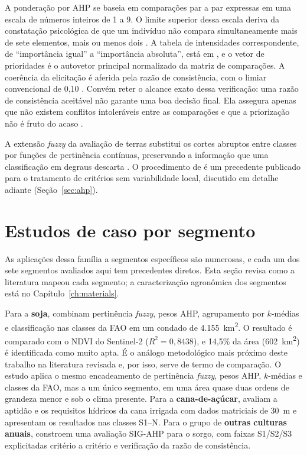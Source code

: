 A ponderação por AHP se baseia em comparações par a par expressas em uma escala de números inteiros de
1 a 9. O limite superior dessa escala deriva da constatação psicológica de que um indivíduo não compara
simultaneamente mais de sete elementos, mais ou menos dois \citep[pp.~245--246]{saaty_scaling_1977}.
A tabela de intensidades correspondente, de ``importância igual'' a ``importância absoluta'', está em
\citet[Tabela~1, p.~246]{saaty_scaling_1977}, e o vetor de prioridades é o autovetor principal
normalizado da matriz de comparações. A coerência da elicitação é aferida pela razão de consistência,
com o limiar convencional de 0,10 \citep[p.~171]{saaty_analytic_1987}. Convém reter o alcance exato
dessa verificação: uma razão de consistência aceitável não garante uma boa decisão final. Ela
assegura apenas que não existem conflitos intoleráveis entre as comparações e que a priorização não é
fruto do acaso \citep[p.~2]{frish_enhancing_2025}.

A extensão \emph{fuzzy} da avaliação de terras substitui os cortes abruptos entre classes por funções de
pertinência contínuas, preservando a informação que uma classificação em degraus descarta
\citep{nisar_ahamed_gis-based_2000,yaghmaeian_mahabadi_land_2012}. O procedimento de
\citet{alburo_application_2019} é um precedente publicado para o tratamento de critérios sem
variabilidade local, discutido em detalhe adiante (Seção~\ref{sec:ahp}).

\section{Estudos de caso por segmento}\label{sec:sota-casos}

As aplicações dessa família a segmentos específicos são numerosas, e cada um dos sete segmentos avaliados
aqui tem precedentes diretos. Esta seção revisa como a literatura mapeou cada segmento; a
caracterização agronômica dos segmentos está no Capítulo~\ref{ch:materials}.

Para a \textbf{soja}, \citet[p.~1]{radocaj_optimal_2020} combinam pertinência \emph{fuzzy}, pesos AHP,
agrupamento por $k$-médias e classificação nas classes da FAO em um condado de 4.155~km\textsuperscript{2}.
O resultado é comparado com o NDVI do Sentinel-2 ($R^2 = 0{,}8438$), e 14,5\% da área
(602~km\textsuperscript{2}) é identificada como muito apta. É o análogo metodológico mais próximo deste
trabalho na literatura revisada e, por isso, serve de termo de comparação. O estudo aplica o mesmo
encadeamento de pertinência \emph{fuzzy}, pesos AHP, $k$-médias e classes da FAO, mas a um único
segmento, em uma área quase duas ordens de grandeza menor e sob o clima presente.
Para a \textbf{cana-de-açúcar}, \citet[pp.~2, 4--5]{haile_assessment_2026} avaliam a aptidão e os
requisitos hídricos da cana irrigada com dados matriciais de 30~m e apresentam os resultados nas classes
S1--N. Para o grupo de \textbf{outras culturas anuais}, \citet[pp.~6--8]{tadesse_land_2020} constroem uma
avaliação SIG-AHP para o sorgo, com faixas S1/S2/S3 explicitadas critério a critério e verificação da
razão de consistência.

